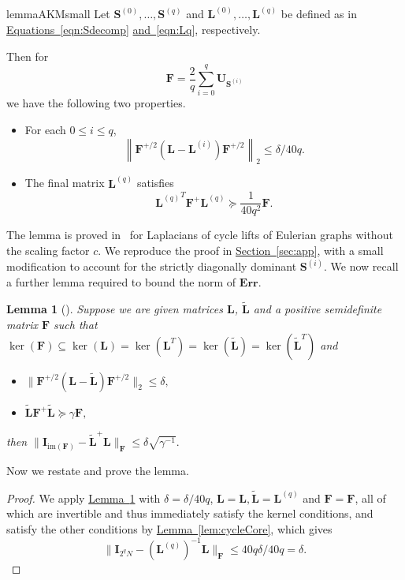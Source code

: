 \documentclass[11pt]{article}
\numberwithin{equation}{section}
\newtheorem{lemma}[theorem]{Lemma}
\theoremstyle{definition}
\theoremstyle{plain}
\newcommand{\expref}[2]{\hyperref[#2]{#1~\ref{#2}}}
\newcommand{\expeqref}[2]{\hyperref[#2]{#1~\eqref{#2}}}
\newcommand{\mU}{\mathbf{U}}
\newcommand{\mS}{\mathbf{S}}
\newcommand{\mF}{\mathbf{F}}
\newcommand{\mL}{\mathbf{L}}
\newcommand{\I}{\mathbf{I}}
\newcommand{\sym}[1][ ]{\mU_{#1}}
\newcommand{\lbar}{\left\|}
\newcommand{\rbar}{\right\|}
\newcommand{\Lq}{\mathbf{L}^{(q)}}
\newcommand{\Err}{\mathbf{Err}}
\begin{document}
%
\begin{restatable}{lemma}{AKMsmall}
\label{lem:cycleCore}
  Let $\mS^{(0)},\dots,\mS^{(q)}$ and $\mL^{(0)},\dots,\Lq$ be defined as in 
\expeqref{Equations}{eqn:Sdecomp} \expeqref{and}{eqn:Lq}, respectively. %
%

Then for 
$$\mF = \frac{2}{q}\sum_{i=0}^q\sym[\mS^{(i)}]$$
we have the following %
two properties. %
\begin{itemize}
    \item For each $0\leq i \leq q$,
    $$\lbar \mF^{+/2}(\mL-\mL^{(i)})\mF^{+/2}\rbar_2 \leq \delta/40q .$$ %
    
    \item The final matrix $\Lq$ satisfies 
    $${\Lq}^T \mF^{+}\Lq \succeq \frac{1}{40q^2}\mF.$$
\end{itemize}
\end{restatable}
The lemma is proved in~\cite{AhmadinejadKeMuPeSiVa19} for Laplacians of cycle lifts of Eulerian graphs without the scaling factor $c$. We reproduce the proof in \expref{Section}{sec:app}, with a small modification to account for the strictly diagonally dominant
%
$\mS^{(i)}$.  %
We now recall a further lemma required to bound the norm of $\Err$.
%
\begin{lemma}[{\cite[Lemma D.4]{AhmadinejadKeMuPeSiVa19}}]\label{lem:D4}  %
Suppose we are given matrices $\mL$, $\widetilde{\mL}$ and a positive
%
semidefinite  %
matrix $\mF$ such that $\ker(\mF) \subseteq \ker(\mL) = \ker(\mL^T) = \ker(\widetilde{\mL}) = \ker(\widetilde{\mL}^T)$ and
\begin{itemize}
    \item $\|\mF^{+/2}(\mL-\widetilde{\mL})\mF^{+/2}\|_2\leq \delta,$
    \item $\widetilde{\mL}\mF^+\widetilde{\mL}\succeq \gamma \mF,$
\end{itemize}
then $\|\I_{\text{im}(\mF)}-\widetilde{\mL}^+\mL\|_\mF \leq \delta \sqrt{\gamma^{-1}}.$
\end{lemma}
%
Now we restate and prove the lemma.  %
\goodF*
\begin{proof}
  We apply \expref{Lemma}{lem:D4} with $\delta=\delta/40q$, $\mL=\mL,\widetilde{\mL}=\Lq$ and $\mF=\mF$, all of which are invertible and thus immediately satisfy the kernel
%
conditions, %
and satisfy the other %
conditions  %
by \expref{Lemma}{lem:cycleCore}, which gives
\[\|\I_{2^qN}-(\Lq)^{-1}\mL\|_\mF\leq 40q\delta/40q= \delta. \]
\end{proof}
\end{document}
